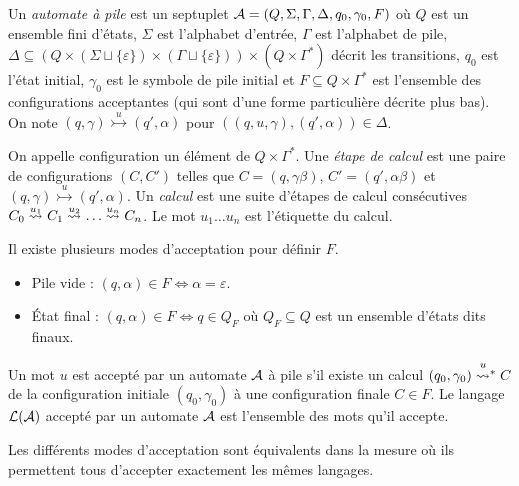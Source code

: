 \documentclass[../../agregation.tex]{subfiles}
\begin{document}
\begin{defn}
	Un \emph{automate à pile} est un septuplet $\mathcal{A}=(Q,\Sigma, \Gamma, \Delta, q_0, \gamma_0, F)$ où $Q$ est un ensemble fini d'états, $\Sigma$ est l'alphabet d'entrée, $\Gamma$ est l'alphabet de pile, $\Delta\subseteq\left(Q\times (\Sigma\sqcup \{\varepsilon\})\times (\Gamma \sqcup \{\varepsilon\})\right)\times\left( Q\times \Gamma^*\right)$ décrit les transitions, $q_0$ est l'état initial, $\gamma_0$ est le symbole de pile initial et $F\subseteq Q\times\Gamma^*$ est l'ensemble des configurations acceptantes (qui sont d'une forme particulière décrite plus bas). On note $(q, \gamma)\overset{u}{\rightarrowtail} (q', \alpha)$ pour $((q,u,\gamma),(q',\alpha))\in \Delta$.
\end{defn}

\begin{defn}
	On appelle configuration un élément de $Q\times\Gamma^*$. Une \emph{étape de calcul} est une paire de configurations $(C,C')$ telles que $C=(q,\gamma\beta)$, $C'=(q',\alpha\beta)$ et $(q, \gamma)\overset{u}{\rightarrowtail} (q', \alpha)$. Un \emph{calcul} est une suite d'étapes de calcul consécutives $C_0\transitionn{u_1}{}C_1\transitionn{u_2}{}\dots \transitionn{u_n}{}C_n$. Le mot $u_1\dots u_n$ est l'étiquette du calcul.
\end{defn}

\begin{defn}
	Il existe plusieurs modes d'acceptation pour définir $F$.
	\begin{itemize}
		\item Pile vide : $(q,\alpha)\in F \iff \alpha = \varepsilon$.
		\item État final : $(q,\alpha)\in F \iff q\in Q_F$ où $Q_F\subseteq Q$ est un ensemble d'états dits finaux.
	\end{itemize}
\end{defn}

\begin{defn}
	Un mot $u$ est accepté par un automate $\mathcal{A}$ à pile s'il existe un calcul $(q_0,\gamma_0)\transitionn{u}{*}C$ de la configuration initiale $(q_0,\gamma_0)$ à une configuration finale $C\in F$. Le langage $\mathcal{L}(\mathcal{A})$ accepté par un automate $\mathcal{A}$ est l'ensemble des mots qu'il accepte.
\end{defn}

\begin{prop}
	Les différents modes d'acceptation sont équivalents dans la mesure où ils permettent tous d'accepter exactement les mêmes langages.	
\end{prop}
\end{document}
